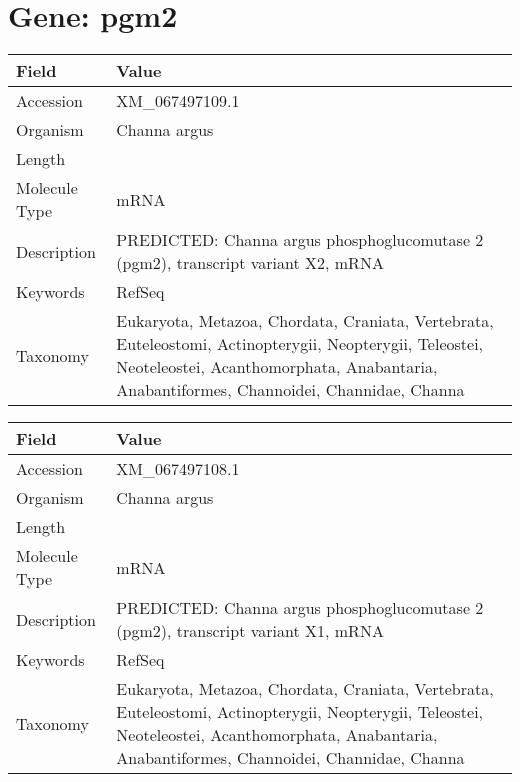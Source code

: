 \documentclass[10pt]{article}
\begin{document}
\section{Gene: pgm2}
{\footnotesize
\begin{longtable}{>{\raggedright\arraybackslash}p{4.5cm} >{\raggedright\arraybackslash}p{11.5cm}}
\textbf{Field} & \textbf{Value} \\
\hline
Accession & XM\_067497109.1 \\
Organism & Channa argus \\
Length & 3234 \\
Molecule Type & mRNA \\
Description & PREDICTED: Channa argus phosphoglucomutase 2 (pgm2), transcript variant X2, mRNA \\
Keywords & RefSeq \\
Taxonomy & Eukaryota, Metazoa, Chordata, Craniata, Vertebrata, Euteleostomi, Actinopterygii, Neopterygii, Teleostei, Neoteleostei, Acanthomorphata, Anabantaria, Anabantiformes, Channoidei, Channidae, Channa \\
\end{longtable}
}

\vspace{1em}
{\footnotesize
\begin{longtable}{>{\raggedright\arraybackslash}p{4.5cm} >{\raggedright\arraybackslash}p{11.5cm}}
\textbf{Field} & \textbf{Value} \\
\hline
Accession & XM\_067497108.1 \\
Organism & Channa argus \\
Length & 3236 \\
Molecule Type & mRNA \\
Description & PREDICTED: Channa argus phosphoglucomutase 2 (pgm2), transcript variant X1, mRNA \\
Keywords & RefSeq \\
Taxonomy & Eukaryota, Metazoa, Chordata, Craniata, Vertebrata, Euteleostomi, Actinopterygii, Neopterygii, Teleostei, Neoteleostei, Acanthomorphata, Anabantaria, Anabantiformes, Channoidei, Channidae, Channa \\
\end{longtable}
}
\end{document}
